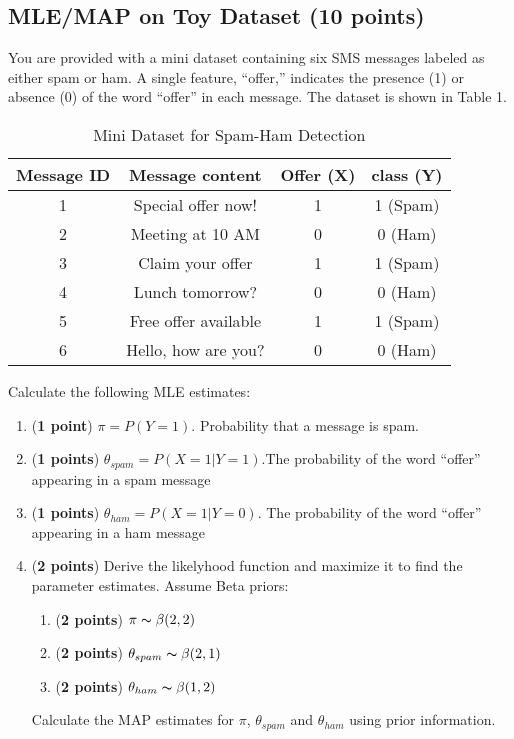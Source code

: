\documentclass[a3paper,12pt]{extarticle} %
\begin{document}
\subsection{MLE/MAP on Toy Dataset (10 points)}
You are provided with a mini dataset containing six SMS messages labeled as either spam or ham. A
single feature, “offer,” indicates the presence (1) or absence (0) of the word “offer” in each message.
The dataset is shown in Table 1.
\begin{table}[h!]
    \centering
    \begin{tabular}{|c|c|c|c|}
        \hline
        \textbf{Message ID} & \textbf{Message content} & \textbf{Offer (X)} & \textbf{class (Y)} \\
        \hline
        1 & Special offer now! & 1 & 1 (Spam) \\
        2 & Meeting at 10 AM & 0 & 0 (Ham) \\
        3 & Claim your offer & 1 & 1 (Spam) \\
        4 & Lunch tomorrow? & 0 & 0 (Ham) \\
        5 & Free offer available & 1 & 1 (Spam) \\
        6 & Hello, how are you? & 0 & 0 (Ham) \\
        \hline
    \end{tabular}
    \caption{Mini Dataset for Spam-Ham Detection}
\end{table}
Calculate the following MLE estimates:
\begin{enumerate}
    \item (\textbf{1 point})  \(\pi = P(Y = 1)\). Probability that a message is spam.
    \item (\textbf{1 points})  \(\theta_{spam} = P(X = 1|Y = 1)\).The probability of the word “offer” appearing in a spam message
    \item (\textbf{1 points})  \(\theta_{ham} = P(X = 1|Y = 0)\). The probability of the word “offer” appearing in a ham message
    \item (\textbf{2 points})  Derive the likelyhood function and maximize it to find the parameter estimates.
    Assume Beta priors:
    \begin{enumerate}
        \item (\textbf{2 points})  \(\pi \thicksim  \beta(2,2)\)
        \item (\textbf{2 points})  \(\theta_{spam} \thicksim  \beta(2,1)\)
        \item (\textbf{2 points})  \(\theta_{ham} \thicksim  \beta(1,2)\)
    \end{enumerate}
    Calculate the MAP estimates for \(\pi\), \(\theta_{spam}\) and \(\theta_{ham}\) using prior information.
\end{enumerate}
\end{document}

